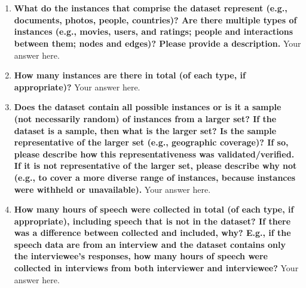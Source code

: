 \documentclass{article}
\begin{document}
    \\\\
    \noindent{}
    
    \begin{enumerate}[leftmargin=0.65cm]
    \scriptsize
        \item \textbf{What do the instances that comprise the dataset represent (e.g., documents, photos, people, countries)? Are there multiple types of instances (e.g., movies, users, and ratings; people and interactions between them; nodes and edges)? Please provide a description.}
        \newline 
        Your answer here.
        \newline 
        \item \textbf{How many instances are there in total (of each type, if appropriate)?}
            \newline 
        Your answer here.
        \newline 
        
        \item \textbf{Does the dataset contain all possible instances or is it a sample (not necessarily random) of instances from a larger set? If the dataset is a sample, then what is the larger set? Is the sample representative of the larger set (e.g., geographic coverage)? If so, please describe how this representativeness was validated/verified. If it is not representative of the larger set, please describe why not (e.g., to cover a more diverse range of instances, because instances were withheld or unavailable).}
        \newline 
        Your answer here.
        \newline 
        
        \item \textbf{How many hours of speech were collected in total (of each type, if appropriate), including speech that is not in the dataset? If there was a difference between collected and included, why? E.g., if the speech data are from an interview and the dataset contains only the interviewee's responses, how many hours of speech were collected in interviews from both interviewer and interviewee?}
        \newline 
        Your answer here.
        \newline 
        

\end{enumerate}
\end{document}
